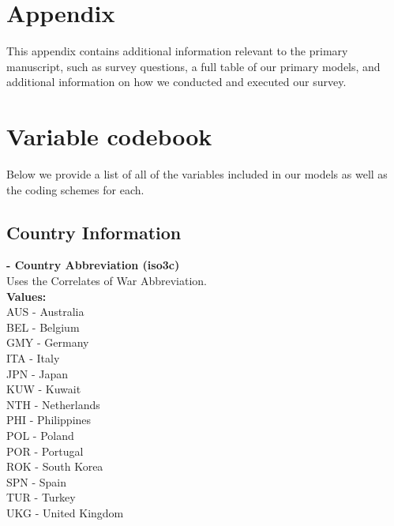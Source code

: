 \documentclass[12pt]{article}
\begin{document}
\appendix
\section*{Appendix} 
\setcounter{table}{0}
\renewcommand{\thetable}{A\arabic{table}}
\setcounter{figure}{0}
\renewcommand{\thefigure}{A\arabic{figure}}

This appendix contains additional information relevant to the primary manuscript, such as survey questions, a full table of our primary models, and additional information on how we conducted and executed our survey.\\  



\newpage

\tableofcontents
\listoftables
\listoffigures


\clearpage

\section{Variable codebook}

Below we provide a list of all of the variables included in our models as well as the coding schemes for each. 

\subsection{Country Information}
\noindent\textbf{  - Country Abbreviation (iso3c)} \\
Uses the Correlates of War Abbreviation. \\
\textbf{Values:}\\
\indent AUS - Australia \\
\indent BEL - Belgium\\
\indent GMY - Germany\\
\indent ITA - Italy\\
\indent JPN - Japan\\
\indent KUW - Kuwait\\
\indent NTH - Netherlands\\
\indent PHI - Philippines\\
\indent POL - Poland\\
\indent POR - Portugal\\
\indent ROK - South Korea\\
\indent SPN - Spain\\
\indent TUR - Turkey\\
\indent UKG - United Kingdom\\
\end{document}

